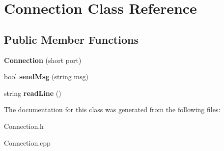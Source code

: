 \hypertarget{class_connection}{}\section{Connection Class Reference}
\label{class_connection}
\subsection*{Public Member Functions}
\begin{DoxyCompactItemize}
\item 
\mbox{\label{class_connection_a8089476d48ba545f44e691cd4bd0278d}} 
{\bfseries Connection} (short port)
\item 
\mbox{\label{class_connection_a4b9f6db1fb42fc9857f829fa0bc52e6e}} 
bool {\bfseries send\+Msg} (string msg)
\item 
\mbox{\label{class_connection_a1df16b436751b686d96c24ca0c498659}} 
string {\bfseries read\+Line} ()
\end{DoxyCompactItemize}


The documentation for this class was generated from the following files\+:\begin{DoxyCompactItemize}
\item 
Connection.\+h\item 
Connection.\+cpp\end{DoxyCompactItemize}
